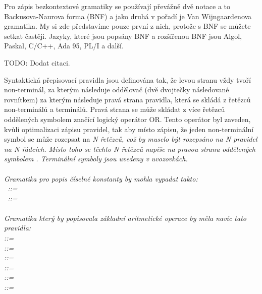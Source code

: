 Pro zápis bezkontextové gramatiky se používají převážně dvě notace a to Backusova-Naurova forma (BNF) a jako druhá v pořadí je Van Wijngaardenova gramatika. My si zde představíme pouze první z nich, protože s BNF se můžete setkat častěji. Jazyky, které jsou popsány BNF a rozšířenou BNF jsou Algol, Paskal, C/C++, Ada 95, PL/I a další. 

TODO: Dodat citaci.

Syntaktická přepisovací pravidla jsou definována tak, že levou stranu vždy tvoří non-terminál, za kterým následuje oddělovač \uv{::=} (dvě dvojtečky následované rovnítkem) za kterým následuje pravá strana pravidla, která se skládá z řetězců non-terminálů a terminálů. Pravá strana se může skládat z více řetězců oddělených symbolem \uv{\textbar} značící logický operátor OR. Tento operátor byl zaveden, kvůli optimalizaci zápisu pravidel, tak aby místo zápisu, že jeden non-terminální symbol se může rozepsat na \it{N} řetězců, což by muselo být rozepsáno na \it{N} pravidel na \it{N} řádcích. Místo toho se těchto \it{N} řetězců napíše na pravou stranu oddělených symbolem \uv{\textbar}. Terminální symboly jsou uvedeny v uvozovkách.
\cite{BCF}
\\ \\
Gramatika pro popis číselné konstanty by mohla vypadat takto:\\
~::= ~\textbar~  \\
~::=~~\textbar~~\textbar~~\textbar~~\textbar~~
\textbar~~\textbar~~\textbar~~\textbar~~\textbar~ \\
\\
Gramatika který by popisovala základní aritmetické operace by měla navíc tato pravidla:\\
 ::=  \uv{+}  \\
 ::=  \uv{-}  \\
 ::=  \uv{\(\times\)}  \\
 ::=  \uv{/}  \\
 ::= \uv{(}  \uv{)} \\
 ::= \\


